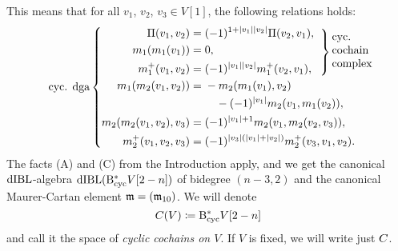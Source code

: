 \documentclass[\MainFolder/Text.tex]{subfiles}
\begin{document}
This means that for all $v_1$, $v_2$, $v_3 \in V[1]$, the following relations holds:
\begin{equation}\label{Eq:CycDGA}{\hbadness=10000 \text{cyc. dga}\left\{ \begin{aligned} \Pair(v_1,v_2) &= (-1)^{1+ \Abs{v_1} \Abs{v_2}} \Pair(v_2, v_1), &
\mathclap{
\smash{
\raisebox{-0.58cm}{$
\hspace{-0.8cm}
\left.\begin{aligned}\mathstrut\\ \mathstrut\\ \mathstrut \end{aligned}\right\}
\text{\parbox{5em}{cyc. cochain complex}}
$}}}
\\
m_1(m_1(v_1)) &= 0, &\\
m_1^+(v_1, v_2) &= (-1)^{\Abs{v_1}\Abs{v_2}} m_1^+(v_2, v_1), &\\
 m_1(m_2(v_1,v_2)) &= \begin{multlined}[t]- m_2(m_1(v_1),v_2)  \\ - (-1)^{\Abs{v_1}} m_2(v_1,m_1(v_2)), \end{multlined} &\\
m_2(m_2(v_1, v_2), v_3) &= (-1)^{\Abs{v_1} + 1} m_2(v_1,m_2(v_2,v_3)), &\\
m_2^+(v_1, v_2, v_3) &= (-1)^{\Abs{v_3}(\Abs{v_1}+\Abs{v_2})}m_2^+(v_3, v_1, v_2).
\end{aligned}\right.}
\end{equation}
The facts (A) and (C) from the Introduction apply, and we get the canonical $\mathrm{dIBL}$-algebra $\mathrm{dIBL}(\mathrm{B}_{\mathrm{cyc}}^* V[2-n])$ of bidegree $(n-3,2)$ and the canonical Maurer-Cartan element $\mathfrak{m} = (\mathfrak{m}_{10})$. We will denote
$$ C(V)\coloneqq \mathrm{B}_{\mathrm{cyc}}^* V[2-n] $$
and call it the space of \emph{cyclic cochains on $V$}. If $V$ is fixed, we will write just $C$.
\end{document}
